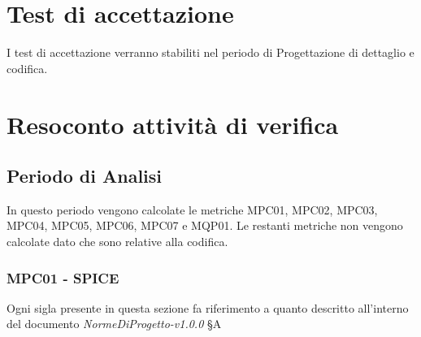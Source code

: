 \section{Test di accettazione}
I test di accettazione verranno stabiliti nel periodo di Progettazione di dettaglio e codifica.

\section{Resoconto attività di verifica}

\subsection{Periodo di Analisi}
In questo periodo vengono calcolate le metriche MPC01, MPC02, MPC03, MPC04, MPC05, MPC06, MPC07 e MQP01. Le restanti metriche non vengono calcolate dato che sono relative alla codifica.

\subsubsection{MPC01 - SPICE}
Ogni sigla presente in questa sezione fa riferimento a quanto descritto all'interno del documento \textit{NormeDiProgetto-v1.0.0} §A

